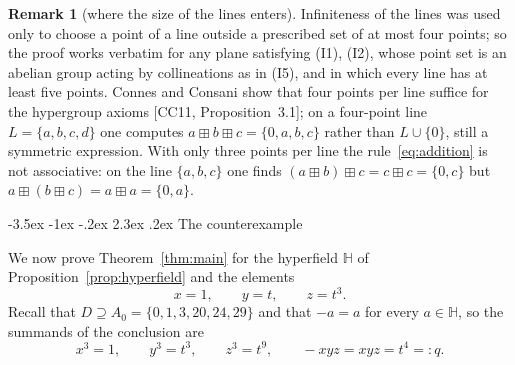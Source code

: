 \documentclass[12pt]{article}
\makeatletter
\renewcommand\section{\@startsection{section}{1}{\z@}%
  {-3.5ex \@plus -1ex \@minus -.2ex}%
  {2.3ex \@plus.2ex}%
  {\normalfont\bfseries}}
\theoremstyle{plain}
\theoremstyle{definition}
\newtheorem{remark}[theorem]{Remark}
\newcommand{\Hh}{\mathbb{H}}
\newcommand{\bp}{\boxplus}
\makeatother
\begin{document}
\begin{remark}[where the size of the lines enters]\label{rem:linesize}
Infiniteness of the lines was used only to choose a point of a line
outside a prescribed set of at most four points; so the proof works
verbatim for any plane satisfying (I1), (I2), whose point set is an
abelian group acting by collineations as in (I5), and in which every
line has at least five points.  Connes and Consani show that four points per
line suffice for the hypergroup axioms [CC11, Proposition~3.1]; on a
four-point line $L=\{a,b,c,d\}$ one computes
$a\bp b\bp c=\{0,a,b,c\}$ rather than $L\cup\{0\}$, still a symmetric
expression.
With only three points per line the rule~\eqref{eq:addition} is not
associative: on the line $\{a,b,c\}$ one finds
$(a\bp b)\bp c=c\bp c=\{0,c\}$ but $a\bp(b\bp c)=a\bp a=\{0,a\}$.
\end{remark}

\section{The counterexample}\label{sec:counterexample}

We now prove Theorem~\ref{thm:main} for the hyperfield $\Hh$ of
Proposition~\ref{prop:hyperfield} and the elements
\[
 x=1,\qquad y=t,\qquad z=t^3 .
\]
Recall that $D\supseteq A_0=\{0,1,3,20,24,29\}$ and that $-a=a$ for
every $a\in\Hh$, so the summands of the conclusion are
\[
 x^3=1,\qquad y^3=t^3,\qquad z^3=t^9,\qquad -xyz=xyz=t^4=:q .
\]
\end{document}
